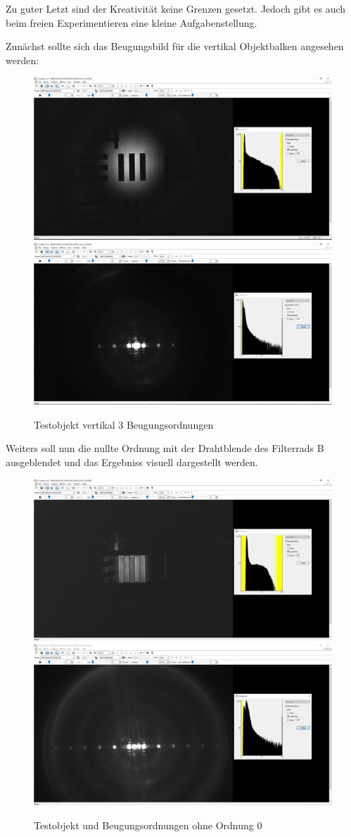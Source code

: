 \documentclass[12pt,a4paper,twoside]{article}
\begin{document}
Zu guter Letzt sind der Kreativität keine Grenzen gesetzt. Jedoch gibt es auch beim freien Experimentieren eine kleine Aufgabenstellung. \newline

\noindent
Zunächst sollte sich das Beugungsbild für die vertikal Objektbalken angesehen werden:

\begin{figure}[H]
    \centering
    \includegraphics[width=0.45\linewidth]{nudes/AbbeTheorie/Aufgabe 3/4-2 vertikal ohne.PNG}
    \includegraphics[width=0.45\linewidth]{nudes/AbbeTheorie/Aufgabe 3/4-2 vertikal mit.PNG}
    \caption{Testobjekt vertikal 3 Beugungsordnungen}
    \label{fig:Aufabe3-horizontal}
\end{figure}

\noindent
Weiters soll nun die nullte Ordnung mit der Drahtblende des Filterrads B ausgeblendet und das Ergebniss visuell dargestellt werden.

\begin{figure}[H]
    \centering
    \includegraphics[width=0.45\linewidth]{nudes/AbbeTheorie/Aufgabe 3/4-2 ohne 0te ohne.PNG}
    \includegraphics[width=0.45\linewidth]{nudes/AbbeTheorie/Aufgabe 3/4-2 ohne 0te mit.PNG}
    \caption{Testobjekt und Beugungsordnungen ohne Ordnung 0}
    \label{fig:Aufabe3-ohneNullte}
\end{figure}
\end{document}
